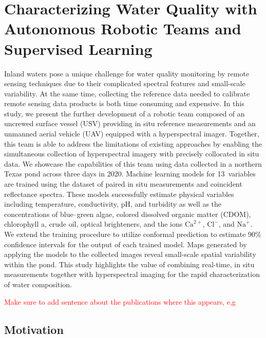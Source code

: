 \chapter{Characterizing Water Quality with Autonomous Robotic Teams and Supervised Learning}\label{ch:robot-team-supervised}

Inland waters pose a unique challenge for water quality monitoring by remote
sensing techniques due to their complicated spectral features and
small-scale variability. At the same time, collecting the reference data
needed to calibrate remote sensing data products is both time consuming and
expensive. In this study, we present the further development of a robotic
team composed of an uncrewed surface vessel (USV) providing in situ
reference measurements and an unmanned aerial vehicle (UAV) equipped with a
hyperspectral imager. Together, this team is able to address the limitations
of existing approaches by enabling the simultaneous collection of
hyperspectral imagery with precisely collocated in situ data. We showcase
the capabilities of this team using data collected in a northern Texas pond
across three days in 2020. Machine learning models for 13~variables are
trained using the dataset of paired in situ measurements and coincident
reflectance spectra. These models successfully estimate physical variables
including temperature, conductivity, pH, and turbidity as well as the
concentrations of blue--green algae, colored dissolved organic matter
(CDOM), chlorophyll a, crude oil, optical brighteners, and the ions
$\mathrm{Ca}^{2+}$, $\mathrm{Cl}^{-}$, and $\mathrm{Na}^{+}$. We extend the
training procedure to utilize conformal prediction to estimate 90\%
confidence intervals for the output of each trained model. Maps generated by
applying the models to the collected images reveal small-scale spatial
variability within the pond. This study highlights the value of combining
real-time, in situ measurements together with hyperspectral imaging for the
rapid characterization of water composition.


\textcolor{red}{
  Make sure to add sentence about the publications where this appears, e,g
  \cite{robot-team-2}
}

\section{Motivation}


